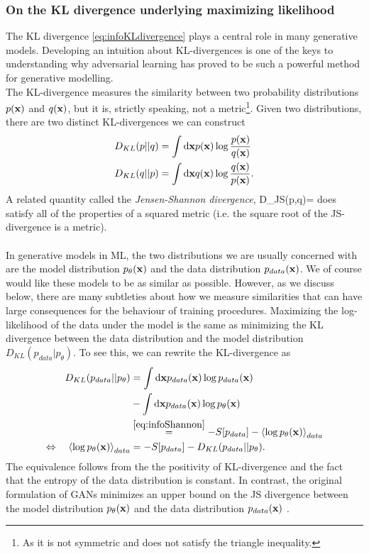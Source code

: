 \subsubsection{On the KL divergence underlying maximizing likelihood}
The KL divergence \ref{eq:infoKLdivergence} plays a central role in many generative models. Developing an intuition about KL-divergences is one of the keys to understanding why adversarial learning has proved to be such a powerful method for generative modelling.\\
The KL-divergence measures the similarity between two probability distributions $p(\mathbf{x})$ and $q(\mathbf{x})$, but it is, strictly speaking, not a metric\footnote{As it is not symmetric and does not satisfy the triangle inequality.}. Given two distributions, there are two distinct KL-divergences we can construct
\begin{align}
	D_{KL}(p||q) &= \int \mathrm{d} \mathbf{x} p(\mathbf{x}) \log \frac{p(\mathbf{x})}{q(\mathbf{x})} \\
	D_{KL}(q||p) &= \int \mathrm{d} \mathbf{x} q(\mathbf{x}) \log \frac{q(\mathbf{x})}{p(\mathbf{x})}.
\end{align}
A related quantity called the \emph{Jensen-Shannon divergence},
\be 
\label{eq:vaeGanJSdivergence}
D_{JS}(p,q)=\half {}
\ee 
does satisfy all of the properties of a squared metric (i.e. the square root of the JS-divergence is a metric).\\
\\
In generative models in ML, the two distributions we are usually concerned with are the model distribution $p_\theta(\mathbf{x})$ and the data distribution $p_{data}(\mathbf{x})$. We of course would like these models to be as similar as possible. However, as we discuss below, there are many subtleties about how we measure similarities that can have large consequences for the behaviour of training procedures. Maximizing the log-likelihood of the data under the model is the same as minimizing the KL divergence between the data distribution and the model distribution $D_{KL}(p_{data}|p_\theta)$. To see this, we can rewrite the KL-divergence as
\begin{align*}
	D_{KL}(p_{data} ||p_\theta) &= \int \mathrm{d} \mathbf{x} p_{data} (\mathbf{x}) \log p_{data}(\mathbf{x}) \\
	&- \int \mathrm{d} \mathbf{x} p_{data}(\mathbf{x}) \log p_\theta(\mathbf{x}) \\
	&\stackrel{\ref{eq:infoShannon}}{=} - S[p_{data}] -\expval{\log p_\theta(\mathbf{x})}_{data}  \\
	\Leftrightarrow\quad \expval{\log p_\theta(\mathbf{x})}_{data} &=-S[p_{data}] - D_{KL}(p_{data}||p_\theta).
\end{align*}
The equivalence follows from the the positivity of KL-divergence and the fact that the entropy of the data distribution is constant. In contrast, the original formulation of GANs minimizes an upper bound on the JS divergence between the model distribution $p_\theta(\mathbf{x})$ and the data distribution $p_{data}(\mathbf{x})$ .
